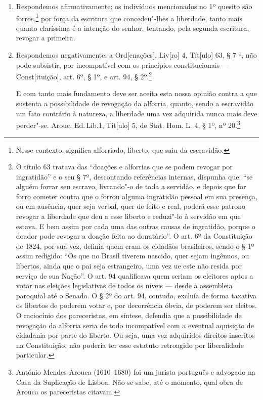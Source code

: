 \begin{enumerate}[label=Ao \arabic*º]
\item Respondemos afirmativamente: os indivíduos mencionados no 1º
quesito são forros,\footnote{Nesse contexto, significa alforriado,
  liberto, que saiu da escravidão.} por força da escritura que
concedeu"-lhes a liberdade, tanto mais quanto claríssima é a intenção do
senhor, tentando, pela segunda escritura, revogar a primeira.

\item Respondemos negativamente: a Ord{[}enações{]}, Liv{[}ro{]} 4,
Tít{[}ulo{]} 63, § 7 º, não pode subsistir, por incompatível com os
princípios constitucionais --- Const{[}ituição{]}, art. 6º, § 1º, e
art. 94, § 2º.\footnote{O título 63 tratava das ``doações e alforrias
  que se podem revogar por ingratidão'' e o seu § 7º, descontando
  referências internas, dispunha que: ``se alguém forrar seu escravo,
  livrando"-o de toda a servidão, e depois que for forro cometer contra
  que o forrou alguma ingratidão pessoal em sua presença, ou em
  ausência, quer seja verbal, quer de feito e real, poderá esse patrono
  revogar a liberdade que deu a esse liberto e reduzi"-lo à servidão em
  que estava. E bem assim por cada uma das outras causas de ingratidão,
  porque o doador pode revogar a doação feita ao donatário''. O art. 6º
  da Constituição de 1824, por sua vez, definia quem eram os cidadãos
  brasileiros, sendo o § 1º assim redigido: ``Os que no Brasil tiverem
  nascido, quer sejam ingênuos, ou libertos, ainda que o pai seja
  estrangeiro, uma vez ue este não resida por serviço de sua Nação''. O
  art. 94 qualificava quem seriam os eleitores aptos a votar nas
  eleições legislativas de todos os níveis --- desde a assembleia
  paroquial até o Senado. O § 2º do art. 94, contudo, excluía de forma
  taxativa os libertos de poderem votar e, por decorrência óbvia, de
  poderem ser eleitos. O raciocínio dos pareceristas, em síntese,
  defendia que a possibilidade de revogação da alforria seria de todo
  incompatível com a eventual aquisição de cidadania por parte do
  liberto. Ou seja, uma vez adquiridos direitos inscritos na
  Constituição, não poderia ter esse estatuto retroagido por
  liberalidade particular.}

E com tanto mais fundamento deve ser aceita esta nossa opinião contra a
que sustenta a possibilidade de revogação da alforria, quanto, sendo a
escravidão um fato contrário à natureza, a liberdade uma vez adquirida
nunca mais deve perder"-se. Arouc. Ed.\,Lib.1, Tit{[}ulo{]} 5, de Stat.
Hom. L. 4, § 1º, nº 20.\footnote{António Mendes Arouca (1610--1680) foi
  um jurista português e advogado na Casa da Suplicação de Lisboa. Não
  se sabe, até o momento, qual obra de Arouca os pareceristas citavam.}


\end{enumerate}
